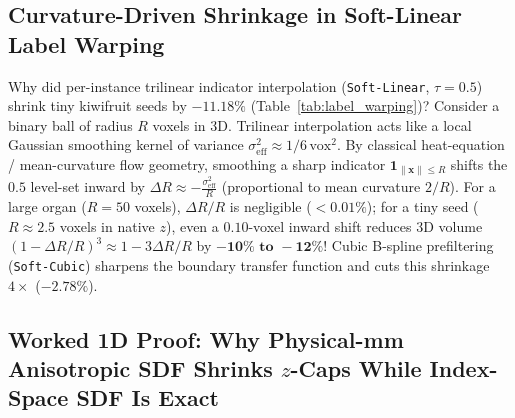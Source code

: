 \documentclass[10pt,a4paper]{article}
\renewcommand{\_}{\origunderscore\allowbreak}
\begin{document}
\subsection{Curvature-Driven Shrinkage in Soft-Linear Label Warping}

Why did per-instance trilinear indicator interpolation (\texttt{Soft-Linear}, $\tau=0.5$) shrink tiny kiwifruit seeds by $-11.18\%$ (Table~\ref{tab:label_warping})? Consider a binary ball of radius $R$ voxels in 3D. Trilinear interpolation acts like a local Gaussian smoothing kernel of variance $\sigma_{\text{eff}}^2 \approx 1/6\,\text{vox}^2$. By classical heat-equation / mean-curvature flow geometry, smoothing a sharp indicator $\mathbf{1}_{\|\mathbf{x}\|\le R}$ shifts the $0.5$ level-set inward by $\Delta R \approx -\frac{\sigma_{\text{eff}}^2}{R}$ (proportional to mean curvature $2/R$). For a large organ ($R = 50$ voxels), $\Delta R/R$ is negligible ($<0.01\%$); for a tiny seed ($R \approx 2.5$ voxels in native $z$), even a $0.10$-voxel inward shift reduces 3D volume $(1 - \Delta R/R)^3 \approx 1 - 3\Delta R/R$ by $\mathbf{-10\%\text{ to }-12\%}$! Cubic B-spline prefiltering (\texttt{Soft-Cubic}) sharpens the boundary transfer function and cuts this shrinkage $4\times$ ($-2.78\%$).

\subsection{Worked 1D Proof: Why Physical-mm Anisotropic SDF Shrinks $z$-Caps While Index-Space SDF Is Exact}
\end{document}

